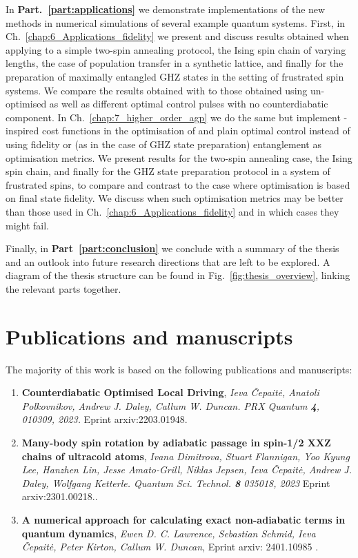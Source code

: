 In \textbf{Part.~\ref{part:applications}} we demonstrate implementations of the new methods in numerical simulations of several example quantum systems. First, in Ch.~\ref{chap:6_Applications_fidelity} we present and discuss results obtained when applying  to a simple two-spin annealing protocol, the Ising spin chain of varying lengths, the case of population transfer in a synthetic lattice, and finally for the preparation of maximally entangled GHZ states in the setting of frustrated spin systems. We compare the results obtained with  to those obtained using un-optimised  as well as different optimal control pulses with no counterdiabatic component. In Ch.~\ref{chap:7_higher_order_agp} we do the same but implement -inspired cost functions in the optimisation of  and plain optimal control instead of using fidelity or (as in the case of GHZ state preparation) entanglement as optimisation metrics. We present results for the two-spin annealing case, the Ising spin chain, and finally for the GHZ state preparation protocol in a system of frustrated spins, to compare and contrast to the case where optimisation is based on final state fidelity. We discuss when such optimisation metrics may be better than those used in Ch.~\ref{chap:6_Applications_fidelity} and in which cases they might fail.

Finally, in \textbf{Part~\ref{part:conclusion}} we conclude with a summary of the thesis and an outlook into future research directions that are left to be explored. A diagram of the thesis structure can be found in Fig.~\ref{fig:thesis_overview}, linking the relevant parts together.

\section{Publications and manuscripts}

The majority of this work is based on the following publications and manuscripts:

\begin{enumerate}
    \item \textbf{Counterdiabatic Optimised Local Driving}, \textit{Ieva Čepaitė, Anatoli Polkovnikov, Andrew J. Daley, Callum W. Duncan. PRX Quantum \textbf{4}, 010309, 2023.} Eprint arxiv:2203.01948. \cite{cepaite_counterdiabatic_2023}
    \item \textbf{Many-body spin rotation by adiabatic passage in
    spin-1/2 XXZ chains of ultracold atoms}, \textit{Ivana Dimitrova, Stuart Flannigan, Yoo Kyung Lee, Hanzhen Lin,  Jesse Amato-Grill, Niklas Jepsen, Ieva Čepaitė, Andrew J. Daley, Wolfgang Ketterle. Quantum Sci. Technol. \textbf{8} 035018, 2023} Eprint arxiv:2301.00218.\cite{dimitrova_many-body_2023}.
    \item \textbf{A numerical approach for calculating exact non-adiabatic terms in quantum dynamics}, \textit{Ewen D. C. Lawrence, Sebastian Schmid, Ieva Čepaitė, Peter Kirton, Callum W. Duncan}, Eprint arxiv: 2401.10985 \cite{lawrence_numerical_2024}.
\end{enumerate}

